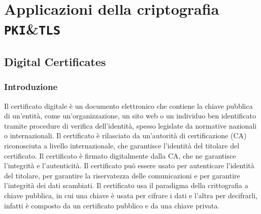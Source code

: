\chapter{Applicazioni della criptografia \texttt{PKI}\&\texttt{TLS}}
\thispagestyle{chapterInit}
\label{ch:PIK-TLS}
\section{Digital Certificates}
    \subsection{Introduzione}
        Il certificato digitale è un documento elettronico che contiene la chiave pubblica di un'entità, come un'organizzazione, un sito web o un individuo ben identificato tramite procedure di verifica dell'identità, spesso legislate da normative nazionali o internazionali. Il certificato è rilasciato da un'autorità di certificazione (CA) riconosciuta a livello internazionale, che garantisce l'identità del titolare del certificato. Il certificato è firmato digitalmente dalla CA, che ne garantisce l'integrità e l'autenticità. Il certificato può essere usato per autenticare l'identità del titolare, per garantire la riservatezza delle comunicazioni e per garantire l'integrità dei dati scambiati.
        Il certificato usa il paradigma della crittografia a chiave pubblica, in cui una chiave è usata per cifrare i dati e l'altra per decifrarli, infatti è composto da un certificato pubblico e da una chiave privata.
